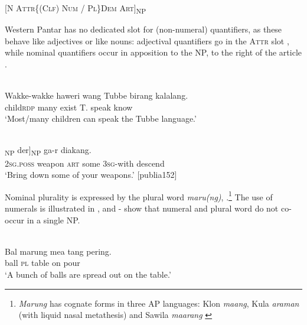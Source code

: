  [\textsc{N  Attr\{(Clf) Num / Pl\}Dem  Art]}\textsc{\textsubscript{NP}}
 
\z


Western Pantar has no dedicated slot for (non-numeral) quantifiers, as these behave like adjectives or like nouns: adjectival quantifiers go in the A\textsc{ttr} slot , while nominal quantifiers occur in apposition to the NP, to the right of the article .



\ea%
\label{ex:9:13}
 \\
\gll  Wakke-wakke haweri wang Tubbe birang kalalang. \\
   child{\Tilde}\textsc{rdp} many exist T. speak know  \\
\glt `Most/many children can speak the Tubbe language.'
\z







\ea%
\label{ex:9:14}
 \\
\gll [[{Hai} bloppa sing]\textsubscript{NP} {der}]\textsubscript{NP} ga-r diakang.  \\
  \textsc{2sg.poss} weapon \textsc{art} some 3\textsc{sg-}with descend  \\
\glt `Bring down some of your weapons.' [publia152]
\z






Nominal plurality is expressed by the plural word \textit{maru(ng)}, .\footnote{\textit{Marung} has cognate forms in three AP languages: Klon \textit{maang}, Kula \textit{araman} (with liquid nasal metathesis) and Sawila \textit{maarang} \citep{SchapperEtAlms}} The use of numerals is illustrated in , and - show that numeral and plural word do not co-occur in a single NP.


\ea%
\label{ex:9:15}
 \\
\gll  Bal  marung mea tang pering. \\
 ball \textsc{pl} table on pour   \\
\glt `A bunch of balls are spread out on the table.'
\z







